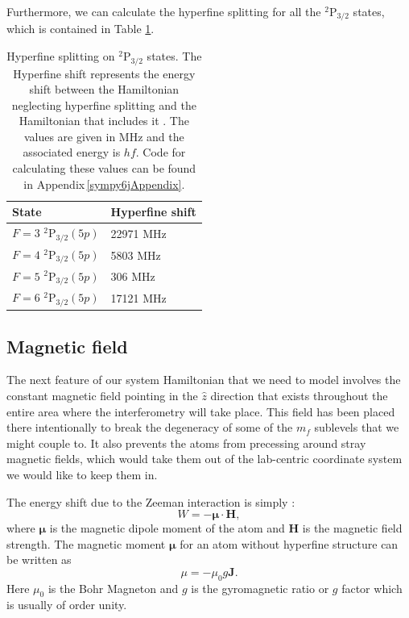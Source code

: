 Furthermore, we can calculate the hyperfine splitting for all the $^2$P$_{3/2}$ states, which is contained in Table \ref{tableOfHyperfinedeetuings}.

\begin{table}[h]
\centering
\begin{tabular}{|l|l|}
\hline
State & Hyperfine shift  \\ \hline \hline
$F=3$ $^2$P$_{3/2} (5p)$ & 22971  MHz\\ \hline
$F=4$ $^2$P$_{3/2} (5p)$ &  5803 MHz\\ \hline
$F=5$ $^2$P$_{3/2} (5p)$ &  306 MHz\\ \hline
$F=6$ $^2$P$_{3/2} (5p)$ &   17121 MHz\\ \hline
\end{tabular}
\caption{Hyperfine splitting on $^2$P$_{3/2}$ states. The Hyperfine shift represents the energy shift between the Hamiltonian neglecting hyperfine splitting and the Hamiltonian that includes it
. The values are given in MHz and the associated energy is $hf$. Code for calculating these values can be found in Appendix\,\ref{sympy6jAppendix}.}
\label{tableOfHyperfinedeetuings}
\end{table}

\subsection{Magnetic field}\label{zeeman}

The next feature of our system Hamiltonian that we need to model involves the constant magnetic field pointing in the $\hat{z}$ direction that exists throughout the entire area where the interferometry will take place. This field has been placed there intentionally to break the degeneracy of some of the $m_f$ sublevels that we might couple to. It also prevents the atoms from precessing around stray magnetic fields, which would take them out of the lab-centric coordinate system we would like to keep them in.

The energy shift due to the Zeeman interaction is simply \cite{sobelman_spectra}: 
\begin{equation}
W=-\mathbf{\mu}\cdot\mathbf{H},
\end{equation}
where $\mathbf{\mu}$ is the magnetic dipole moment of the atom and $\mathbf{H}$ is the magnetic field strength. The magnetic moment $\mathbf{\mu}$ for an atom without hyperfine structure can be written as \cite{sobelman_spectra}
\begin{equation}
\mu=-\mu_0 g \mathbf{J}.
\end{equation}
Here $\mu_0$ is the Bohr Magneton and $g$ is the gyromagnetic ratio or $g$ factor which is usually of order unity. 

